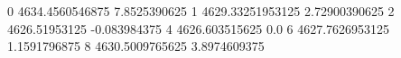 0 4634.4560546875 7.8525390625
1 4629.33251953125 2.72900390625
2 4626.51953125 -0.083984375
4 4626.603515625 0.0
6 4627.7626953125 1.1591796875
8 4630.5009765625 3.8974609375
